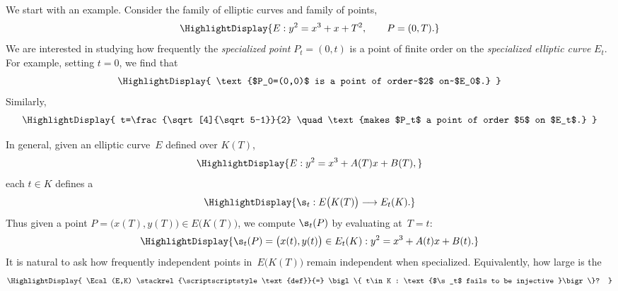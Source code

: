 \documentclass[12pt]{article}
\begin{document}
\Huge
\TitlePage  %



\BeginSlide
{}
We start with an example.
Consider the family of elliptic curves and family of points,
\[\HighlightDisplay{
  E:y^2=x^3+x+T^2,\qquad P=(0,T).
  }
\]
\EndPart
\vspace{-5pt}
We are interested in studying how frequently the \emph{specialized
point} $P_t=(0,t)$ is a point of finite order on the \emph{specialized
elliptic curve} $E_t$.
\EndPart
\vspace{10pt}
For example, setting $t=0$, we find that
\[\HighlightDisplay{
   \text{$P_0=(0,0)$ is a point of order~$2$ on~$E_0$.}
  }
\]
\EndPart
Similarly,
\[\HighlightDisplay{
  t=\frac{\sqrt[4]{\sqrt5-1}}{2}
  \quad\text{makes $P_t$ a point of order $5$ on $E_t$.}
  }
\]
\EndSlide

\BeginSlide
{}
In general, given an elliptic curve~$E$ defined over $K(T)$, 
\[\HighlightDisplay{
  E:y^2 = x^3+A(T)x+B(T),
  }
\]
each
$t\in K$ defines a 
\[\HighlightDisplay{
  \s_t : E\bigl(K(T)\bigr) \longrightarrow E_t(K).
  }
\]
\EndPart
Thus given a point $P=\bigl(x(T),y(T)\bigr)\in E\bigl(K(T)\bigr)$, we
compute $\s_t(P)$ by evaluating at~$T=t$:
\[\HighlightDisplay{
  \s_t(P)=\bigl(x(t),y(t)\bigr)\in E_t(K) : y^2=x^3+A(t)x+B(t).
  }
\]
\EndPart
It is natural to ask how frequently independent points in~$E\bigl(K(T)\bigr)$
remain independent when specialized. Equivalently, how large is
the 
\[\HighlightDisplay{
  \Ecal(E,K) \stackrel{\scriptscriptstyle\text{def}}{=}
  \bigl\{ t\in K : \text{$\s_t$ fails to be injective }\bigr\}?
  }
\]
\EndSlide
\end{document}
